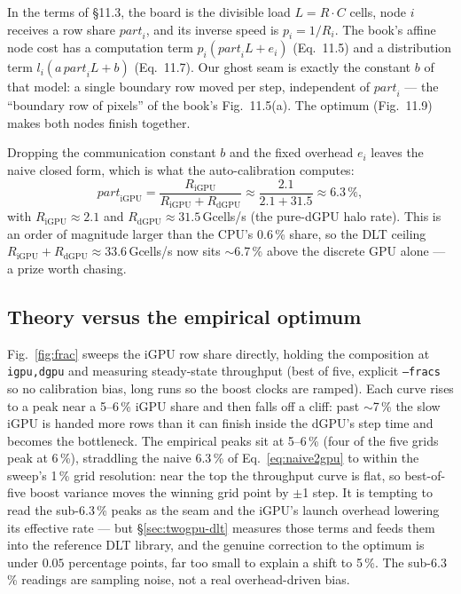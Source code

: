 \documentclass[
	english,
	letterpaper, oneside
]{article}
\begin{document}
In the terms of \S11.3, the board is the divisible load $L = R\cdot C$ cells, node $i$
receives a row share $\mathit{part}_i$, and its inverse speed is $p_i = 1/R_i$. The
book's affine node cost has a computation term $p_i(\mathit{part}_i L + e_i)$ (Eq.~11.5)
and a distribution term $l_i(a\,\mathit{part}_i L + b)$ (Eq.~11.7). Our ghost seam is
exactly the constant $b$ of that model: a single boundary row moved per step,
independent of $\mathit{part}_i$ --- the ``boundary row of pixels'' of the book's
Fig.~11.5(a). The optimum (Fig.~11.9) makes both nodes finish together.

Dropping the communication constant $b$ and the fixed overhead $e_i$ leaves the naive
closed form, which is what the auto-calibration computes:
\begin{equation}
	\label{eq:naive2gpu}
	\mathit{part}_\text{iGPU} = \frac{R_\text{iGPU}}{R_\text{iGPU}+R_\text{dGPU}}
	\approx \frac{2.1}{2.1+31.5} \approx 6.3\,\%,
\end{equation}
with $R_\text{iGPU}\approx 2.1$ and $R_\text{dGPU}\approx 31.5$\,Gcells/s (the
pure-dGPU halo rate). This is an order of magnitude larger than the CPU's 0.6\,\%
share, so the DLT ceiling $R_\text{iGPU}+R_\text{dGPU}\approx 33.6$\,Gcells/s now sits
$\sim$6.7\,\% above the discrete GPU alone --- a prize worth chasing.

\subsection{Theory versus the empirical optimum}
\label{sec:twogpu-sweep}

Fig.~\ref{fig:frac} sweeps the iGPU row share directly, holding the composition at
\texttt{igpu,dgpu} and measuring steady-state throughput (best of five, explicit
\texttt{--fracs} so no calibration bias, long runs so the boost clocks are ramped).
Each curve rises to a peak near a 5--6\,\% iGPU share and then falls off a cliff: past
$\sim$7\,\% the slow iGPU is handed more rows than it can finish inside the dGPU's step
time and becomes the bottleneck. The empirical peaks sit at 5--6\,\% (four of the five
grids peak at 6\,\%), straddling the naive 6.3\,\% of Eq.~\eqref{eq:naive2gpu} to within the sweep's 1\,\%
grid resolution: near the top the throughput curve is flat, so best-of-five boost
variance moves the winning grid point by $\pm$1 step. It is tempting to read the
sub-6.3\,\% peaks as the seam and the iGPU's launch overhead lowering its effective
rate --- but \S\ref{sec:twogpu-dlt} measures those terms and feeds them into the
reference DLT library, and the genuine correction to the optimum is under $0.05$
percentage points, far too small to explain a shift to 5\,\%. The sub-6.3\,\% readings
are sampling noise, not a real overhead-driven bias.
\end{document}

